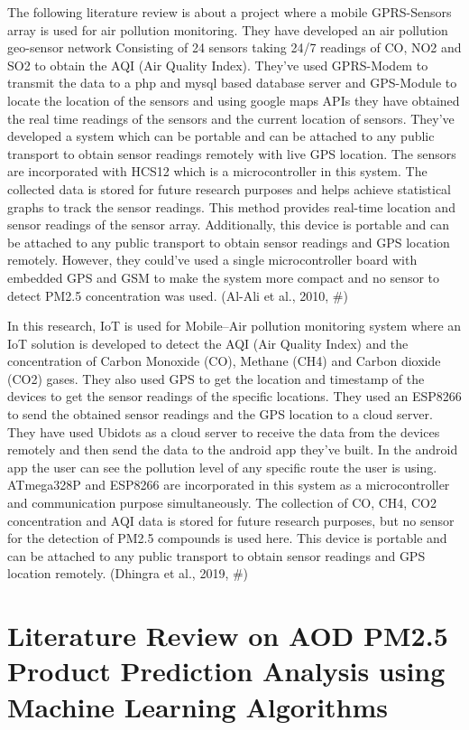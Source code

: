 The following literature review is about a project where a mobile GPRS-Sensors array is used for air pollution monitoring. They have developed an air pollution geo-sensor network Consisting of 24 sensors taking 24/7 readings of CO, NO2 and SO2 to obtain the AQI (Air Quality Index). They've used GPRS-Modem to transmit the data to a php and mysql based database server and GPS-Module to locate the location of the sensors and using google maps APIs they have obtained the real time readings of the sensors and the current location of sensors. They've developed a system which can be portable and can be attached to any public transport to obtain sensor readings remotely with live GPS location. The sensors are incorporated with HCS12 which is a microcontroller in this system. The collected data is stored for future research purposes and helps achieve statistical graphs to track the sensor readings. This method provides real-time location and sensor readings of the sensor array. Additionally, this device is portable and can be attached to any public transport to obtain sensor readings and GPS location remotely. However, they could’ve used a single microcontroller board with embedded GPS and GSM to make the system more compact and no sensor to detect PM2.5 concentration was used. (Al-Ali et al., 2010, #)

In this research, IoT is used for Mobile–Air pollution monitoring system where an IoT solution is developed to detect the AQI (Air Quality Index) and the concentration of Carbon Monoxide (CO), Methane (CH4) and Carbon dioxide (CO2) gases. They also used GPS to get the location and timestamp of the devices to get the sensor readings of the specific locations. They used an ESP8266 to send the obtained sensor readings and the GPS location to a cloud server. They have used Ubidots as a cloud server to receive the data from the devices remotely and then send the data to the android app they’ve built. In the android app the user can see the pollution level of any specific route the user is using. ATmega328P and ESP8266 are incorporated in this system as a microcontroller and communication purpose simultaneously. The collection of CO, CH4, CO2 concentration and AQI data is stored for future research purposes, but no sensor for the detection of PM2.5 compounds is used here. This device is portable and can be attached to any public transport to obtain sensor readings and GPS location remotely. (Dhingra et al., 2019, #)

\section{Literature Review on AOD PM2.5 Product Prediction Analysis using Machine Learning Algorithms}

